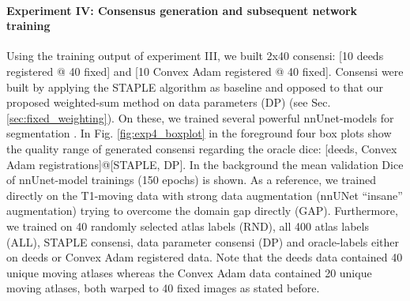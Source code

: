     \paragraph{\textbf{Experiment IV: Consensus generation and subsequent network training}}
    Using the training output of experiment III, we built 2x40 consensi: [10 deeds registered @ 40 fixed] and [10 Convex Adam registered @ 40 fixed]. Consensi were built by applying the STAPLE algorithm as baseline and opposed to that our proposed weighted-sum method on data parameters (DP) (see Sec. \ref{sec:fixed_weighting}).
    On these, we trained several powerful nnUnet-models for segmentation
    \citep{isensee2021nnu}.
    In Fig. \ref{fig:exp4_boxplot} in the foreground four box plots show the quality range of generated consensi regarding the oracle dice: [deeds, Convex Adam registrations]@[STAPLE, DP].
    In the background the mean validation Dice of nnUnet-model trainings (150 epochs) is shown. As a reference, we trained directly on the T1-moving data with strong data augmentation (nnUNet ``insane'' augmentation) trying to overcome the domain gap directly (GAP). Furthermore, we trained on 40 randomly selected atlas labels (RND), all 400 atlas labels (ALL), STAPLE consensi, data parameter consensi (DP) and oracle-labels either on deeds or Convex Adam registered data. Note that the deeds data contained 40 unique moving atlases whereas the Convex Adam data contained 20 unique moving atlases, both warped to 40 fixed images as stated before.

